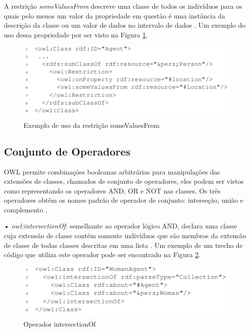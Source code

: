 \documentclass{bcc}
\begin{document}
A restrição \textit{someValuesFrom} descreve uma classe de todos os indivíduos para os quais pelo menos um valor da propriedade em questão é uma instância da descrição da classe ou um valor de dados no intervalo de dados \cite{welty2004}. Um exemplo do uso dessa propriedade por ser visto na Figura \ref{fig:somevalues}.

\begin{figure}[H]
\centering
\includegraphics[width=.9\textwidth]{Figuras/some_values.PNG}
\caption{Exemplo de uso da restrição someValuesFrom}
\label{fig:somevalues}
\end{figure}

\subsection{Conjunto de Operadores}

OWL permite combinações booleanas arbitrárias para manipulações das extensões de classes, chamados de conjunto de operadores, eles podem ser vistos como representando os operadores AND, OR e NOT nas classes. Os três operadores obtêm os nomes padrão de operador de conjunto: interseção, união e complemento \cite{bechhofer2004}.

• \textit{owl:intersectionOf}: semelhante ao operador lógico AND, declara uma classe cuja extensão de classe contém somente indivíduos que são membros da extensão de classe de todas classes descritas em uma lista \cite{bechhofer2004}. Um exemplo de um trecho de código que utiliza este operador pode ser encontrado na Figura \ref{fig:opand}.

\begin{figure}[H]
\centering
\includegraphics[width=.9\textwidth]{Figuras/op_and.PNG}
\caption{Operador intersectionOf}
\label{fig:opand}
\end{figure}
\end{document}
